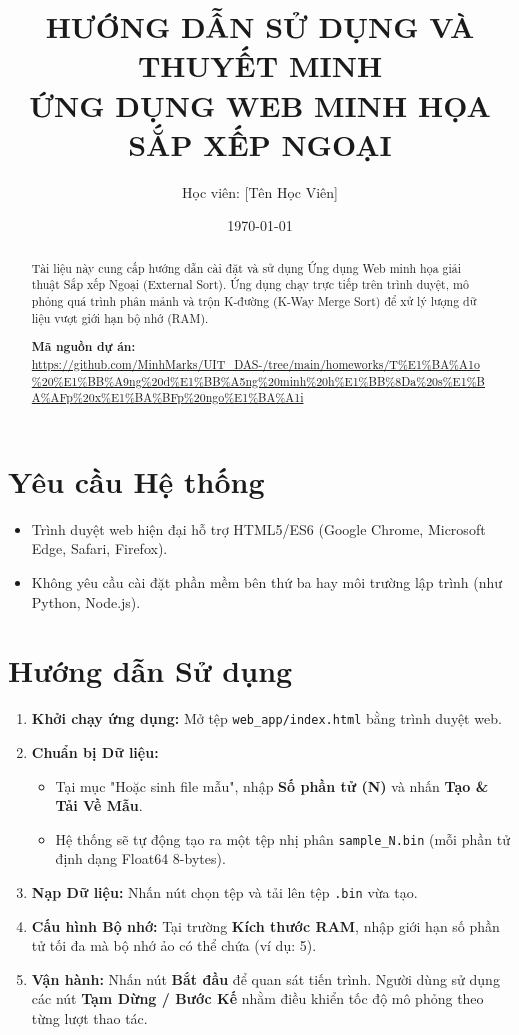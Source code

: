 \documentclass[a4paper,12pt]{article}
\title{\textbf{HƯỚNG DẪN SỬ DỤNG VÀ THUYẾT MINH \\ ỨNG DỤNG WEB MINH HỌA SẮP XẾP NGOẠI}}
\author{Học viên: [Tên Học Viên]}
\date{\today}
\begin{document}
\maketitle

\begin{abstract}
Tài liệu này cung cấp hướng dẫn cài đặt và sử dụng Ứng dụng Web minh họa giải thuật Sắp xếp Ngoại (External Sort). Ứng dụng chạy trực tiếp trên trình duyệt, mô phỏng quá trình phân mảnh và trộn K-đường (K-Way Merge Sort) để xử lý lượng dữ liệu vượt giới hạn bộ nhớ (RAM).

\textbf{Mã nguồn dự án:} \url{https://github.com/MinhMarks/UIT_DAS-/tree/main/homeworks/T%E1%BA%A1o%20%E1%BB%A9ng%20d%E1%BB%A5ng%20minh%20h%E1%BB%8Da%20s%E1%BA%AFp%20x%E1%BA%BFp%20ngo%E1%BA%A1i}
\end{abstract}

\section{Yêu cầu Hệ thống}
\begin{itemize}
    \item Trình duyệt web hiện đại hỗ trợ HTML5/ES6 (Google Chrome, Microsoft Edge, Safari, Firefox).
    \item Không yêu cầu cài đặt phần mềm bên thứ ba hay môi trường lập trình (như Python, Node.js).
\end{itemize}

\section{Hướng dẫn Sử dụng}
\begin{enumerate}
    \item \textbf{Khởi chạy ứng dụng:} Mở tệp \texttt{web\_app/index.html} bằng trình duyệt web.
    \item \textbf{Chuẩn bị Dữ liệu:}
          \begin{itemize}
              \item Tại mục "Hoặc sinh file mẫu", nhập \textbf{Số phần tử (N)} và nhấn \textbf{Tạo \& Tải Về Mẫu}. 
              \item Hệ thống sẽ tự động tạo ra một tệp nhị phân \texttt{sample\_N.bin} (mỗi phần tử định dạng Float64 8-bytes).
          \end{itemize}
    \item \textbf{Nạp Dữ liệu:} Nhấn nút chọn tệp và tải lên tệp \texttt{.bin} vừa tạo.
    \item \textbf{Cấu hình Bộ nhớ:} Tại trường \textbf{Kích thước RAM}, nhập giới hạn số phần tử tối đa mà bộ nhớ ảo có thể chứa (ví dụ: 5).
    \item \textbf{Vận hành:} Nhấn nút \textbf{Bắt đầu} để quan sát tiến trình. Người dùng sử dụng các nút \textbf{Tạm Dừng / Bước Kế} nhằm điều khiển tốc độ mô phỏng theo từng lượt thao tác.
\end{enumerate}
\end{document}
